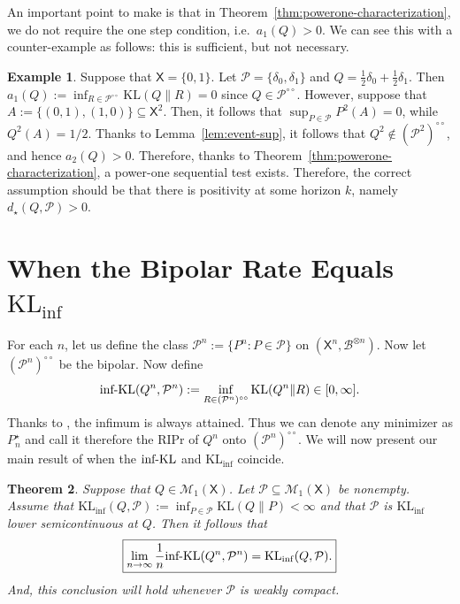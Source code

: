 \documentclass[11pt]{article}
\newcommand{\KL}{\mathrm{KL}}
\newcommand{\KLinf}{\mathrm{KL}_{\mathrm{inf}}}
\newcommand{\infKL}{\textnormal{inf-KL}}
\newcommand{\Pcal}{\mathcal{P}}
\newcommand{\X}{\mathsf{X}}
\newcommand{\B}{\mathcal{B}}
\newtheorem{theorem}{Theorem}[section]
\theoremstyle{definition}
\newtheorem{example}[theorem]{Example}
\theoremstyle{definition}
\begin{document}
An important point to make is that in Theorem~\ref{thm:powerone-characterization}, we do not require the one step condition, i.e.\ $a_1(Q)>0$. We can see this with a counter-example as follows: this is sufficient, but not necessary. 

\begin{example}\label{ex:onestep-suf}
Suppose that $\X=\{0,1\}$. Let $\Pcal=\{\delta_0, \delta_1\}$ and $Q=\frac12 \delta_0 + \frac12 \delta_1$. Then $a_1(Q):=\inf_{R\in\Pcal^{\circ\circ}}\KL(Q\|R)=0$ since $Q\in\Pcal^{\circ\circ}$. However, suppose that $A:=\{(0,1),(1,0)\}\subseteq \X^2$. Then, it follows that $\sup_{P\in\Pcal}P^{2}(A)=0$, while $Q^{2}(A)=1/2$. Thanks to Lemma~\ref{lem:event-sup}, it follows that $Q^2\notin (\Pcal^2)^{\circ\circ}$, and hence $a_2(Q)>0$. Therefore, thanks to Theorem~\ref{thm:powerone-characterization}, a power-one sequential test exists. Therefore, the correct assumption should be that there is positivity at some horizon $k$, namely $d_\star(Q,\Pcal)>0$.    
\end{example}


\section{When the Bipolar Rate Equals $\KLinf$}\label{sec:bipeqklinf}

For each $n$, let us define the class $\Pcal^n:=\{P^n:P\in\Pcal\}$ on $(\X^n, \B^{\otimes n})$. Now let $(\Pcal^n)^{\circ\circ}$ be the bipolar. Now define
\[
\infKL(Q^n,\Pcal^n) := \inf_{R\in(\Pcal^n)^{\circ\circ}} \KL(Q^n\|R)\in[0,\infty].
\]
Thanks to \parencite{larsson2025numeraire}, the infimum is always attained. Thus we can denote any minimizer as $P_n^\star$ and call it therefore the RIPr of $Q^n$ onto $(\Pcal^n)^{\circ\circ}$. We will now present our main result of when the $\infKL$ and $\KLinf$ coincide.

\begin{theorem}\label{thm:main}
Suppose that $Q\in\mathcal{M}_1(\X)$. Let $\Pcal\subseteq\mathcal{M}_1(\X)$ be nonempty. Assume that $\KLinf(Q, \Pcal):=\inf_{P\in\Pcal}\KL(Q\|P)<\infty$ and that $\Pcal$ is $\KLinf$ lower semicontinuous at $Q$. Then it follows that
\[
\boxed{
\lim_{n\to\infty}\frac{1}{n}\infKL(Q^n,\Pcal^n)=\KL_{\inf}(Q,\Pcal).
}
\]
And, this conclusion will hold whenever $\Pcal$ is weakly compact.
\end{theorem}
\end{document}
